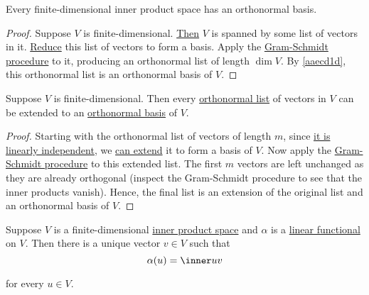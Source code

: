\label{b0c9a08}

Every finite-dimensional inner product space has an orthonormal basis.

\begin{proof}
  Suppose $V$ is finite-dimensional. \href{c4cd6dd}{Then} $V$ is spanned by some
  list of vectors in it. \href{cc16f54}{Reduce} this list of vectors to form a
  basis. Apply the \href{ee6ac50}{Gram-Schmidt procedure} to it, producing an
  orthonormal list of length $\dim V$. By \autoref{aaecd1d}, this orthonormal
  list is an orthonormal basis of $V$.
\end{proof}

\label{de56b1f}

Suppose $V$ is finite-dimensional. Then every \href{d90fcb1}{orthonormal list}
of vectors in $V$ can be extended to an \href{e112aa0}{orthonormal basis} of
$V$.

\begin{proof}
  Starting with the orthonormal list of vectors of length $m$, since
  \href{c0eb6f5}{it is linearly independent}, we \href{f0fa1cd}{can extend} it
  to form a basis of $V$. Now apply the \href{ee6ac50}{Gram-Schmidt procedure}
  to this extended list. The first $m$ vectors are left unchanged as they are
  already orthogonal (inspect the Gram-Schmidt procedure to see that the inner
  products vanish). Hence, the final list is an extension of the original list
  and an orthonormal basis of $V$.
\end{proof}

\label{ec6fa79}

Suppose $V$ is a finite-dimensional \href{b9935c8}{inner product space} and
$\alpha$ is a \href{b0b1db8}{linear functional} on $V$. Then there is a unique
vector $v\in V$ such that
$$
  \alpha(u)=\inner uv
$$

for every $u\in V$.

